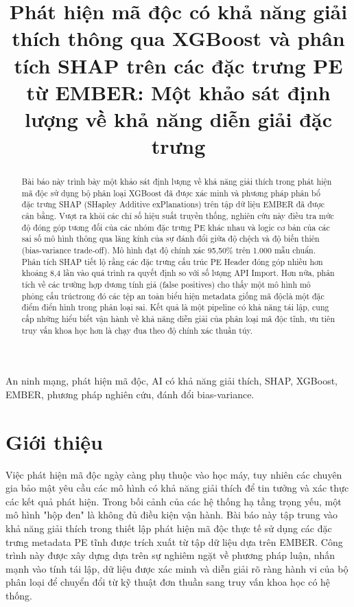 \documentclass[conference]{IEEEtran}
\begin{document}
\title{Phát hiện mã độc có khả năng giải thích thông qua XGBoost và phân tích SHAP trên các đặc trưng PE từ EMBER: Một khảo sát định lượng về khả năng diễn giải đặc trưng}

\author{
}

\maketitle

\begin{abstract}
Bài báo này trình bày một khảo sát định lượng về khả năng giải thích trong phát hiện mã độc sử dụng bộ phân loại XGBoost đã được xác minh và phương pháp phân bổ đặc trưng SHAP (SHapley Additive exPlanations) trên tập dữ liệu EMBER đã được cân bằng. Vượt ra khỏi các chỉ số hiệu suất truyền thống, nghiên cứu này điều tra mức độ đóng góp tương đối của các nhóm đặc trưng PE khác nhau và logic cơ bản của các sai số mô hình thông qua lăng kính của sự đánh đổi giữa độ chệch và độ biến thiên (bias-variance trade-off). Mô hình đạt độ chính xác 95,50\% trên 1.000 mẫu chuẩn. Phân tích SHAP tiết lộ rằng các đặc trưng cấu trúc PE Header đóng góp nhiều hơn khoảng 8,4 lần vào quá trình ra quyết định so với số lượng API Import. Hơn nữa, phân tích về các trường hợp dương tính giả (false positives) cho thấy một mô hình mô phỏng cấu trúc\text{---}trong đó các tệp an toàn biểu hiện metadata giống mã độc\text{---}là một đặc điểm điển hình trong phân loại sai. Kết quả là một pipeline có khả năng tái lập, cung cấp những hiểu biết vận hành về khả năng diễn giải của phân loại mã độc tĩnh, ưu tiên truy vấn khoa học hơn là chạy đua theo độ chính xác thuần túy.
\end{abstract}

\begin{IEEEkeywords}
An ninh mạng, phát hiện mã độc, AI có khả năng giải thích, SHAP, XGBoost, EMBER, phương pháp nghiên cứu, đánh đổi bias-variance.
\end{IEEEkeywords}

\section{Giới thiệu}
Việc phát hiện mã độc ngày càng phụ thuộc vào học máy, tuy nhiên các chuyên gia bảo mật yêu cầu các mô hình có khả năng giải thích để tin tưởng và xác thực các kết quả phát hiện. Trong bối cảnh của các hệ thống hạ tầng trọng yếu, một mô hình "hộp đen" là không đủ điều kiện vận hành. Bài báo này tập trung vào khả năng giải thích trong thiết lập phát hiện mã độc thực tế sử dụng các đặc trưng metadata PE tĩnh được trích xuất từ tập dữ liệu dựa trên EMBER. Công trình này được xây dựng dựa trên sự nghiêm ngặt về phương pháp luận, nhấn mạnh vào tính tái lập, dữ liệu được xác minh và diễn giải rõ ràng hành vi của bộ phân loại để chuyển đổi từ kỹ thuật đơn thuần sang truy vấn khoa học có hệ thống.
\end{document}
